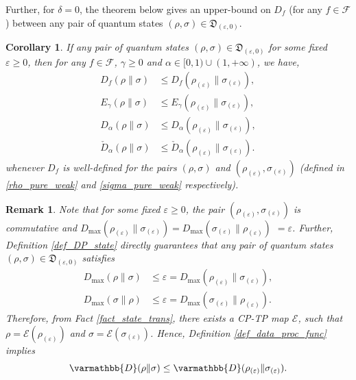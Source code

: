 \documentclass[onecolumn,ldraftcls, 11pt]{IEEEtran}
\newcommand{\nn}{\nonumber}
\newcommand{\eps}{\varepsilon}
\newcommand*{\cF}{\mathcal{F}}
\newcommand*{\cE}{\mathcal{E}}
\newtheorem{remark}{Remark}
\newtheorem{corollary}{Corollary}
\begin{document}
Further, for $\delta =0$, the theorem below gives an upper-bound on $D_f$ (for any $f \in \cF$) between any pair of quantum states $(\rho,\sigma) \in \mathfrak{D}_{(\eps,0)}$.
\begin{corollary}\label{theo_QLDP_F_div_pure_bound}
    If any pair of quantum states $(\rho,\sigma) \in \mathfrak{D}_{(\eps,0)}$ for some fixed $\eps \geq 0$, then for any $f \in \cF$, $\gamma \geq 0$
    and $\alpha \in [0,1) \cup (1,+\infty)$, we have,
    \begin{align}
        D_f(\rho\|\sigma) &\leq D_f(\rho_{(\eps)}\|\sigma_{(\eps)}),\label{theo_QLDP_F_div_pure_bound_eq}\\
        E_{\gamma}(\rho\|\sigma)& \leq E_{\gamma}(\rho_{(\eps)}\|\sigma_{(\eps)}),\label{theo_QLDP_F_div_pure_bound_eq2} \\
        D_{\alpha}(\rho\|\sigma)
        & \leq D_{\alpha}(\rho_{(\eps)}\|\sigma_{(\eps)}),\label{theo_QLDP_F_div_pure_bound_eq3}\\
        \check{D}_{\alpha}(\rho\|\sigma)& \leq 
        \check{D}_{\alpha}(\rho_{(\eps)}\|\sigma_{(\eps)}).\label{theo_QLDP_F_div_pure_bound_eq4}
    \end{align}
   whenever $D_f$ is well-defined for the pairs $(\rho,\sigma)$ and $(\rho_{(\eps)},\sigma_{(\eps)})$ (defined in \eqref{rho_pure_weak} and \eqref{sigma_pure_weak} respectively).
\end{corollary}
\begin{remark}
    Note that for some fixed $\eps \geq 0$, the pair $(\rho_{(\eps)},\sigma_{(\eps)})$ is commutative and $D_{\max}(\rho_{(\eps)}\|\sigma_{(\eps)})= D_{\max}(\sigma_{(\eps)}\|\rho_{(\eps)})$ $ = \eps$. 
    Further, Definition \ref{def_DP_state} directly guarantees that 
     any pair of quantum states $(\rho,\sigma) \in \mathfrak{D}_{(\eps,0)}$ satisfies 
    \begin{align*}
        D_{\max}(\rho\|\sigma) & \leq \eps = D_{\max}(\rho_{(\eps)}\|\sigma_{(\eps)}), \nn\\
        D_{\max}(\sigma\|\rho) &\leq \eps = D_{\max}(\sigma_{(\eps)}\|\rho_{(\eps)}).
            \end{align*}
     Therefore, from Fact \ref{fact_state_trans}, there exists a CP-TP map $\cE$, such that $\rho = \cE(\rho_{(\eps)}) $ and $\sigma =\cE(\sigma_{(\eps)})$. Hence, Definition \ref{def_data_proc_func} implies 
     \begin{equation*}
         \varmathbb{D}(\rho\|\sigma) \leq \varmathbb{D}(\rho_{(\eps)}\|\sigma_{(\eps)}).
     \end{equation*}
\end{remark}
\end{document}
